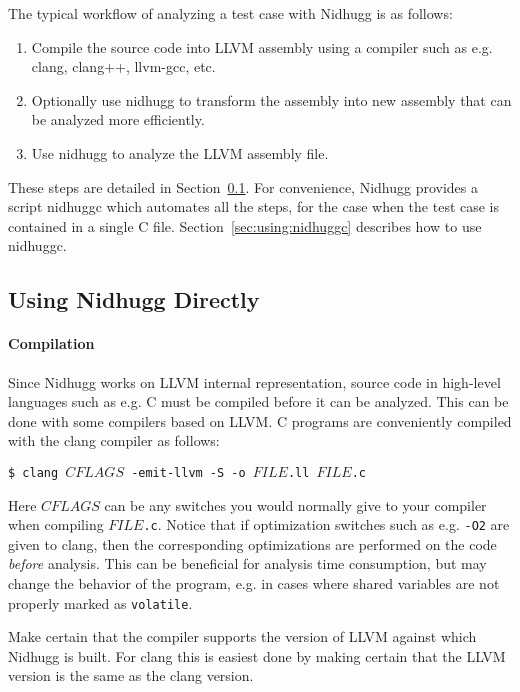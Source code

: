 \documentclass[a4paper]{article}
\begin{document}
The typical workflow of analyzing a test case with Nidhugg is as
follows:

\begin{enumerate}
\item Compile the source code into LLVM assembly using a compiler
  such as e.g. clang, clang++, llvm-gcc, etc.
\item Optionally use \textsf{nidhugg} to transform the assembly into
  new assembly that can be analyzed more efficiently.
\item Use \textsf{nidhugg} to analyze the LLVM assembly file.
\end{enumerate}

These steps are detailed in
Section~\ref{sec:using:nidhugg:directly}. For convenience, Nidhugg
provides a script \textsf{nidhuggc} which automates all the steps, for
the case when the test case is contained in a single C
file. Section~\ref{sec:using:nidhuggc} describes how to use
\textsf{nidhuggc}.

\subsection{Using Nidhugg Directly}\label{sec:using:nidhugg:directly}

\paragraph{Compilation}
%
Since Nidhugg works on LLVM internal representation, source code in
high-level languages such as e.g. C must be compiled before it can be
analyzed. This can be done with some compilers based on LLVM. C
programs are conveniently compiled with the \textsf{clang} compiler as
follows:

\vspace{5pt}
\noindent
\texttt{\$ clang $CFLAGS$ -emit-llvm -S -o $FILE$.ll $FILE$.c}

\vspace{5pt}\noindent
%
Here $CFLAGS$ can be any switches you would normally give to your
compiler when compiling \texttt{$FILE$.c}. Notice that if optimization
switches such as e.g. \texttt{-O2} are given to \textsf{clang}, then
the corresponding optimizations are performed on the code
\emph{before} analysis. This can be beneficial for analysis time
consumption, but may change the behavior of the program, e.g. in cases
where shared variables are not properly marked as \texttt{volatile}.

Make certain that the compiler supports the version of LLVM against
which Nidhugg is built. For \textsf{clang} this is easiest done by
making certain that the LLVM version is the same as the \textsf{clang}
version.
\end{document}
